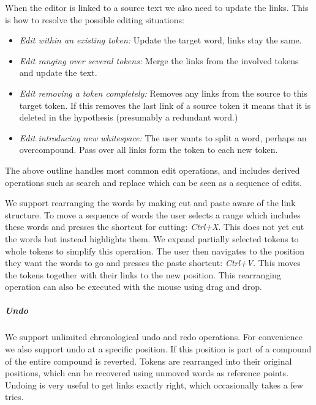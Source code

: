 \documentclass[10pt, a4paper]{article}
\begin{document}
When the editor is linked to a source text we also need to update the links.
This is how to resolve the possible editing situations:

\begin{itemize}

\item {\it Edit within an existing token:}
Update the target word, links stay the same.

\item {\it Edit ranging over several tokens:}
Merge the links from the involved tokens and update the text.

\item {\it Edit removing a token completely:}
Removes any links from the source to this target token.
If this removes the last link of a source token it means that
it is deleted in the hypothesis (presumably a redundant word.)

\item {\it Edit introducing new whitespace:}
The user wants to split a word, perhaps an overcompound.
Pass over all links form the token to each new token.

\end{itemize}

The above outline handles most common edit operations, and includes derived
operations such as search and replace which can be seen as a sequence of edits.

We support rearranging the words by making cut and paste aware of the link
structure. To move a sequence of words the user selects a range
which includes these words and presses the shortcut for cutting: {\it Ctrl+X}.
This does not yet cut the words but instead highlights them. We expand partially
selected tokens to whole tokens to simplify this operation. The user then
navigates to the position they want the words to go and presses the paste
shortcut: {\it Ctrl+V}.
This moves the tokens together with their links to the new position.
This rearranging operation can also be executed with the mouse using drag and drop.

\subparagraph{Undo} We support unlimited chronological undo and redo operations.
For convenience we also support undo at a specific position. %
If this position is part of a compound of the entire compound is reverted. %
Tokens are rearranged into their original positions, which
can be recovered using unmoved words as reference points.
Undoing is very useful to get links exactly right, which occasionally takes a
few tries.
\end{document}
